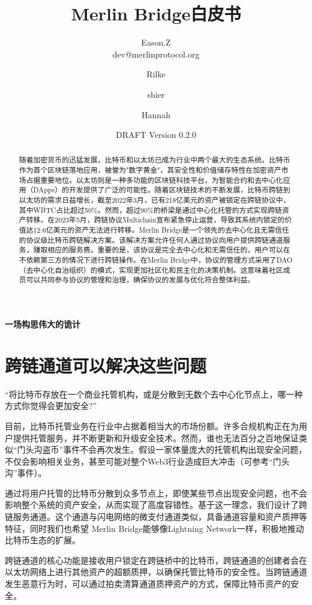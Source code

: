 \documentclass{article}
\title{Merlin Bridge白皮书}
\author{Eason.Z \\dev@merlinprotocol.org \and Rilke \and shier \and Hannah}
\date{DRAFT Version 0.2.0}
\begin{document}
\maketitle

\begin{center}
\Large\textbf{一场构思伟大的诡计}
\end{center}

\begin{abstract}
随着加密货币的迅猛发展，比特币和以太坊已成为行业中两个最大的生态系统。比特币作为首个区块链落地应用，被誉为"数字黄金"，其安全性和价值储存特性在加密资产市场占据重要地位。以太坊则是一种多功能的区块链科技平台，为智能合约和去中心化应用（DApps）的开发提供了广泛的可能性。随着区块链技术的不断发展，比特币跨链到以太坊的需求日益增长，截至2022年3月，已有218亿美元的资产被锁定在跨链协议中，其中WBTC\cite{wbtc}占比超过50\%。然而，超过90\%的桥梁是通过中心化托管的方式实现跨链资产转移。在2023年5月，跨链协议Multichain宣布紧急停止运营，导致其系统内锁定的价值达12.6亿美元的资产无法进行转移。Merlin Bridge是一个领先的去中心化且无需信任的协议级比特币跨链解决方案。该解决方案允许任何人通过协议向用户提供跨链通道服务，赚取相应的服务费。重要的是，该协议是完全去中心化和无需信任的，用户可以在不依赖第三方的情况下进行跨链操作。在Merlin Bridge中，协议的管理方式采用了DAO（去中心化自治组织）的模式，实现更加社区化和民主化的决策机制。这意味着社区成员可以共同参与协议的管理和治理，确保协议的发展与优化符合整体利益。
\end{abstract}

\section{跨链通道可以解决这些问题}
\par “将比特币存放在一个商业托管机构，或是分散到无数个去中心化节点上，哪一种方式你觉得会更加安全?”
\par 目前，比特币托管业务在行业中占据着相当大的市场份额。许多合规机构正在为用户提供托管服务，并不断更新和升级安全技术。然而，谁也无法百分之百地保证类似“门头沟盗币”事件不会再次发生。假设一家体量庞大的托管机构出现安全问题，不仅会影响相关业务，甚至可能对整个Web3行业造成巨大冲击（可参考“门头沟”事件）。
\par 通过将用户托管的比特币分散到众多节点上，即使某些节点出现安全问题，也不会影响整个系统的资产安全，从而实现了高度容错性。基于这一理念，我们设计了跨链服务通道。这个通道与闪电网络\cite{ln}的微支付通道\cite{bitcoinjmicropay}类似，具备通道容量和资产质押等特征，同时我们也希望 Merlin Bridge能够像Lightning Network一样，积极地推动比特币生态的扩展。
\par 跨链通道的核心功能是接收用户锁定在跨链桥中的比特币，跨链通道的创建者会在以太坊网络上进行其他资产的超额质押，以确保托管比特币的安全性。当跨链通道发生恶意行为时，可以通过拍卖清算通道质押资产的方式，保障比特币资产的安全。
\end{document}
